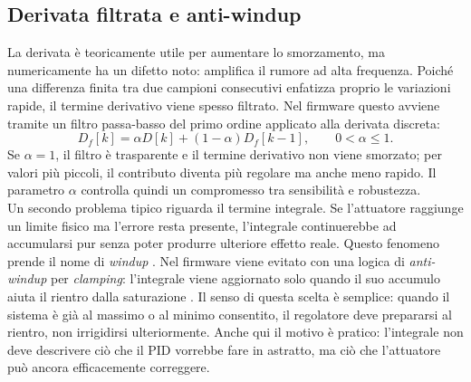 \documentclass[11pt]{report}
\begin{document}
	\subsection{Derivata filtrata e anti-windup}
	La derivata è teoricamente utile per aumentare lo smorzamento, ma numericamente ha un difetto noto: amplifica il rumore ad alta frequenza. Poiché una differenza finita tra due campioni consecutivi enfatizza proprio le variazioni rapide, il termine derivativo viene spesso filtrato. Nel firmware questo avviene tramite un filtro passa-basso del primo ordine applicato alla derivata discreta:
	\begin{equation}
		D_f[k]=\alpha D[k] + (1-\alpha)D_f[k-1], \qquad 0<\alpha\leq 1.
	\end{equation}
	Se $\alpha=1$, il filtro è trasparente e il termine derivativo non viene smorzato; per valori più piccoli, il contributo diventa più regolare ma anche meno rapido. Il parametro $\alpha$ controlla quindi un compromesso tra sensibilità e robustezza.\\
	Un secondo problema tipico riguarda il termine integrale. Se l'attuatore raggiunge un limite fisico ma l'errore resta presente, l'integrale continuerebbe ad accumularsi pur senza poter produrre ulteriore effetto reale. Questo fenomeno prende il nome di \textit{windup} \cite{AstromRundqwist1989}. Nel firmware viene evitato con una logica di \textit{anti-windup} per \textit{clamping}: l'integrale viene aggiornato solo quando il suo accumulo aiuta il rientro dalla saturazione \cite{AstromRundqwist1989}. Il senso di questa scelta è semplice: quando il sistema è già al massimo o al minimo consentito, il regolatore deve prepararsi al rientro, non irrigidirsi ulteriormente. Anche qui il motivo è pratico: l'integrale non deve descrivere ciò che il PID vorrebbe fare in astratto, ma ciò che l'attuatore può ancora efficacemente correggere.

		
\end{document}
